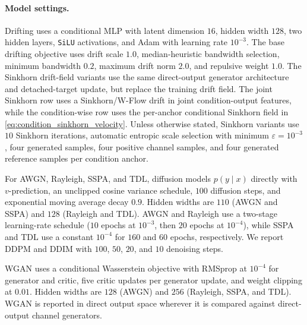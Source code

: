 \documentclass[10pt,journal]{IEEEtran}
\begin{document}
\paragraph{Model settings.}
Drifting uses a conditional MLP with latent dimension \(16\), hidden width \(128\), two hidden layers, \texttt{SiLU} activations, and Adam with learning rate \(10^{-3}\).
The base drifting objective uses drift scale \(1.0\), median-heuristic bandwidth selection, minimum bandwidth \(0.2\), maximum drift norm \(2.0\), and repulsive weight \(1.0\).
The Sinkhorn drift-field variants use the same direct-output generator architecture and detached-target update, but replace the training drift field.
The joint Sinkhorn row uses a Sinkhorn/W-Flow drift in joint condition-output features, while the condition-wise row uses the per-anchor conditional Sinkhorn field in \eqref{eq:condition_sinkhorn_velocity}.
Unless otherwise stated, Sinkhorn variants use \(10\) Sinkhorn iterations, automatic entropic scale selection with minimum \(\varepsilon=10^{-3}\), four generated samples, four positive channel samples, and four generated reference samples per condition anchor.

For AWGN, Rayleigh, SSPA, and TDL, diffusion models \(p(y\mid x)\) directly with \(v\)-prediction, an unclipped cosine variance schedule, \(100\) diffusion steps, and exponential moving average decay \(0.9\). Hidden widths are \(110\) (AWGN and SSPA) and \(128\) (Rayleigh and TDL). AWGN and Rayleigh use a two-stage learning-rate schedule (\(10\) epochs at \(10^{-3}\), then \(20\) epochs at \(10^{-4}\)), while SSPA and TDL use a constant \(10^{-4}\) for \(160\) and \(60\) epochs, respectively. We report DDPM and DDIM with \(100\), \(50\), \(20\), and \(10\) denoising steps.

WGAN uses a conditional Wasserstein objective with RMSprop at \(10^{-4}\) for generator and critic, five critic updates per generator update, and weight clipping at \(0.01\). Hidden widths are \(128\) (AWGN) and \(256\) (Rayleigh, SSPA, and TDL). WGAN is reported in direct output space wherever it is compared against direct-output channel generators.
\end{document}
